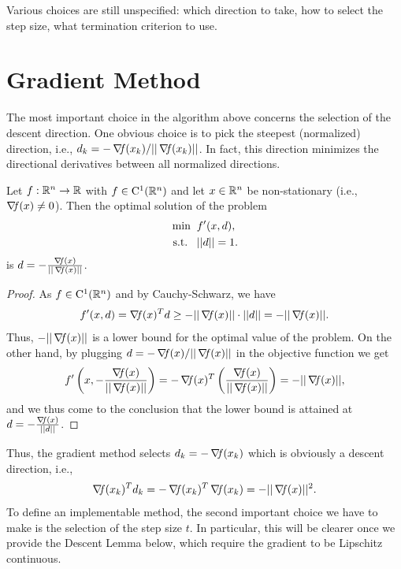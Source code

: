 \documentclass[10pt,a4paper]{article}
\begin{document}
\noindent Various choices are still unspecified: which direction to take, how to select the step size, what termination criterion to use.
\section{Gradient Method}
\noindent The most important choice in the algorithm above concerns the selection of the descent direction. One obvious choice is to pick the steepest (normalized) direction, i.e., $d_k =-\operatorname*{\mathit{\nabla \!f}}(x_k)/||\operatorname*{\mathit{\nabla \!f}}(x_k)||$. In fact, this direction minimizes the directional derivatives between all normalized directions. 
\begin{lemma}
	Let $f:\mathbb{R}^n\to\mathbb{R}$ with $f\in\mathord{\mathrm{C^1}}(\mathbb{R}^n)$ and let $x\in\mathbb{R}^n$ be non-stationary (i.e., $\operatorname*{\mathit{\nabla \!f}}(x)\neq0$). Then the optimal solution of the problem
	\begin{equation*}
		\begin{split}
			\min \;\; &f'(x,d),\\
			\text{s.t.} \;\;\;& ||d||=1.
		\end{split}
	\end{equation*}
is $d=-\frac{\operatorname*{\mathit{\nabla \!f}}(x)}{||\operatorname*{\mathit{\nabla \!f}}(x)||}$.
\end{lemma}
\begin{proof}
	As $f\in \mathord{\mathrm{C^1}}(\mathbb{R}^n)$ and by Cauchy-Schwarz, we have 
	\begin{equation*}
		f'(x,d)=\operatorname*{\mathit{\nabla \!f}}(x)^Td \geq -||\operatorname*{\mathit{\nabla \!f}}(x)||\cdot ||d|| = -||\operatorname*{\mathit{\nabla \!f}}(x)||.
	\end{equation*}
Thus, $-||\operatorname*{\mathit{\nabla \!f}}(x)||$ is a lower bound for the optimal value of the problem. On the other hand, by plugging  $d = -\operatorname*{\mathit{\nabla \!f}}(x)/||\operatorname*{\mathit{\nabla \!f}}(x)||$ in the objective function we get 
\begin{equation*}
	f'\left(x,-\frac{\operatorname*{\mathit{\nabla \!f}}(x)}{||\operatorname*{\mathit{\nabla \!f}}(x)||}\right)=-\operatorname*{\mathit{\nabla \!f}}(x)^T\left(\frac{\operatorname*{\mathit{\nabla \!f}}(x)}{||\operatorname*{\mathit{\nabla \!f}}(x)||}\right)= -||\operatorname*{\mathit{\nabla \!f}}(x)||,
\end{equation*}
and we thus come to the conclusion that the lower bound is attained at $d=-\frac{\operatorname*{\mathit{\nabla \!f}}(x)}{||d||}$.
\end{proof}
\noindent Thus, the gradient method selects $d_k = -\operatorname*{\mathit{\nabla \!f}}(x_k)$ which is obviously a descent direction, i.e., 
\begin{equation*}
\operatorname*{\mathit{\nabla \!f}}(x_k)^Td_k = -\operatorname*{\mathit{\nabla \!f}}(x_k)^T\operatorname*{\mathit{\nabla \!f}}(x_k) = -||\operatorname*{\mathit{\nabla \!f}}(x)||^2.
\end{equation*}
\noindent To define an implementable method, the second important choice we have to make is the selection of the step size $t$. In particular, this will be clearer once we provide the Descent Lemma below, which require the gradient to be Lipschitz continuous. 
\end{document}
